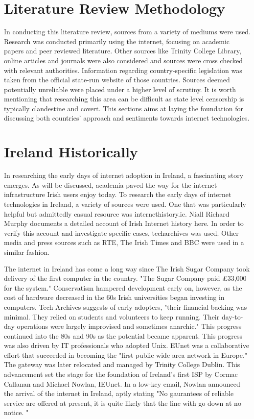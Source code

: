\section{Literature Review Methodology}

In conducting this literature review, sources from a variety of mediums were used. Research was conducted primarily using the internet, focusing on academic papers and peer reviewed literature. Other sources like Trinity College Library, online articles and journals were also considered and sources were cross checked with relevant authorities. Information regarding country-specific legislation was taken from the official state-run website of those countries. Sources deemed potentially unreliable were placed under a higher level of scrutiny. It is worth mentioning that researching this area can be difficult as state level censorship is typically clandestine and covert. This sections aims at laying the foundation for discussing both countries' approach and sentiments towards internet technologies. 

\section{Ireland Historically }
In researching the early days of internet adoption in Ireland, a fascinating story emerges. As will be discussed, academia paved the way for the internet infrastructure Irish users enjoy today. To research the early days of internet technologies in Ireland, a variety of sources were used. One that was particularly helpful but admittedly casual resource was internethistory.ie. \cite{InternetHistoryIE} Niall Richard Murphy documents a detailed account of Irish Internet history here. In order to verify this account and investigate specific cases, techarchives \cite{TechArchivesIE} was used. Other media and press sources such as RTE, The Irish Times and BBC were used in a similar fashion.

The internet in Ireland has come a long way since The Irish Sugar Company took delivery of the first computer in the country. "The Sugar Company paid £33,000 for the system." \cite{irelands_first_computers} Conservatism hampered development early on, however, as the cost of hardware decreased in the 60s Irish universities began investing in computers. Tech Archives suggests of early adopters, "their financial backing was minimal. They relied on students and volunteers to keep running. Their day-to-day operations were largely improvised and sometimes anarchic." \cite{internet_ireland_1987_97} This progress continued into the 80s and 90s as the potential became apparent. This progress was also driven by IT professionals who adopted Unix. EUnet was a collaborative effort that succeeded in becoming the "first public wide area network in Europe." \cite{internet_ireland_1987_97} The gateway was later relocated and managed by Trinity College Dublin. This advancement set the stage for the foundation of Ireland's first ISP by Cormac Callanan and Michael Nowlan, IEUnet. In a low-key email, Nowlan announced the arrival of the internet in Ireland, aptly stating "No gaurantees of reliable service are offered at present, it is quite likely that the line with go down at no notice. " \cite{tcd_scss_t_20160323_001} 


